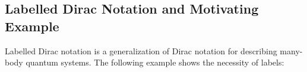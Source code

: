 \subsection{Labelled Dirac Notation and Motivating Example}
Labelled Dirac notation is a generalization of Dirac notation for
describing many-body quantum systems. The following example shows the necessity of labels:



